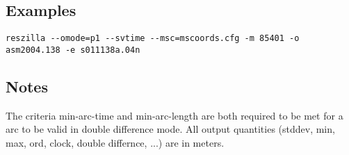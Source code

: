 \subsection{Examples}

\begin{\outputsize}
\begin{lstlisting}
reszilla --omode=p1 --svtime --msc=mscoords.cfg -m 85401 -o asm2004.138 -e s011138a.04n
\end{lstlisting}
\end{\outputsize}

\subsection{Notes}
The criteria min-arc-time and min-arc-length are both required to be met
for a arc to be valid in double difference mode.
All output quantities (stddev, min, max, ord, clock, double differnce, ...)
are in meters.

%

